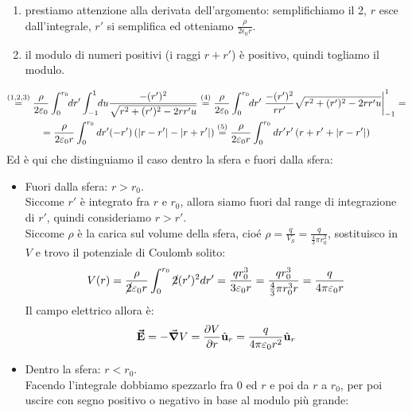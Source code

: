 \begin{examplewt}
\begin{enumerate}
		\item prestiamo attenzione alla derivata dell'argomento: %
		semplifichiamo il 2, $r$ esce dall'integrale, $r'$ si semplifica ed otteniamo $\frac{\rho}{2\epsilon_0 r}$. %
		\item il modulo di numeri positivi (i raggi $r+r'$) è positivo, quindi togliamo il modulo. 
	\end{enumerate}	
	\begin{gather*}
		\stackrel{(1,2,3)}{=}\frac{\rho}{2\epsilon_0}\int^{r_0}_0 \negthickspace dr'\int^1_{-1}\negthickspace du \frac{-(r')^2}{\sqrt{r^2+(r')^2-2rr'u}} \stackrel{(4)}{=}
		\frac{\rho}{2\epsilon_0}\int^{r_0}_0 \negthickspace dr' \eval{\frac{-(r')^2}{rr'} \sqrt{r^2+(r')^2-2rr'u}}^1_{-1}=\\
		=\frac{\rho}{2\epsilon_0r}\int^{r_0}_0 dr' (-r')\left( \abs{r-r'}-\abs{r+r'} \right)
		\stackrel{(5)}{=}\frac{\rho}{2\epsilon_0r}\int^{r_0}_0 dr' r'\left( r+r' + \abs{r-r'} \right)		
	\end{gather*}
Ed è qui che distinguiamo il caso dentro la sfera e fuori dalla sfera:
	\begin{itemize}
		\item Fuori dalla sfera:  $r>r_0$.\\
		Siccome $r'$ è integrato fra $r$ e $r_0$, allora siamo fuori dal range di integrazione di $r'$, quindi consideriamo $r>r'$.\\
		Siccome $\rho$ è la carica sul volume della sfera, cioé $\rho=\frac{q}{V_S}=\frac{q}{\frac{4}{3} \pi r_0^2}$, sostituisco in $V$ e trovo il potenziale di Coulomb solito:
		\begin{gather*}
			V(r)=\frac{\rho}{\cancel 2\epsilon_0 r}\int^{r_0}_0 \cancel 2 (r')^2 dr'= \frac{q r_0^3}{3\epsilon_0 r}=\frac{qr_0^3}{\frac{4}{3}\pi r_0^3 r}=\frac{q}{4\pi \epsilon_0 r}
		\end{gather*}
		Il campo elettrico allora è:
		\begin{gather*}
			\vba E=-\grad V=\pdv{V}{r}\vbh{u}_r =\frac{q}{4\pi\epsilon_0 r^2}\vbh{u}_r		
		\end{gather*}
		\item Dentro la sfera: $r<r_0$.\\
		Facendo l'integrale dobbiamo spezzarlo fra $0$ ed $r$ e poi da $r$ a $r_0$, per poi uscire con segno positivo o negativo in base al modulo più grande: %

\end{itemize}
\end{examplewt}
